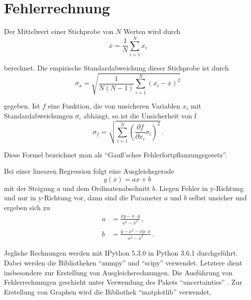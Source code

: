 \section{Fehlerrechnung}
\label{sec:Fehlerrechnung}
Der Mittelwert einer Stichprobe von $N$ Werten wird durch
\begin{equation}
  \overline{x} = \frac{1}{N} \sum\limits_{i = 1}^N x_i
  \label{eqn:mean}
\end{equation}

berechnet.
Die empirische Standardabweichung dieser Stichprobe ist durch
\begin{equation}
  \sigma_x = \sqrt{\frac{1}{N(N-1)}
    \sum\limits_{i = 1}^N
    (x_i-\overline{x})^2}
    \label{eqn:std}
\end{equation}

gegeben.
Ist $f$ eine Funktion, die von unsicheren Variablen $x_i$ mit
Standardabweichungen $\sigma_i$ abhängt, so ist die Unsicherheit von f
\begin{equation}
  \sigma_f = \sqrt{
    \sum\limits_{i = 1}^N
      \left( \frac{\partial f}{\partial x_i} \sigma_i \right)^{\!\! 2}
  }\,.
  \label{eqn:gaussfehler}
\end{equation}

Diese Formel bezeichnet man als \enquote{Gauß'sches Fehlerfortpflanzungsgesetz}.

Bei einer linearen Regression folgt eine Ausgleichsgerade
\begin{equation}
  y(x) = ax+b\,
  \label{eqn:ausgleichsgerade}
\end{equation}
mit der Steigung $a$ und dem Ordinatenabschnitt $b$. Liegen Fehler in y-Richtung
und nur in y-Richtung vor, dann sind die Parameter $a$ und $b$ selbst unsicher
und ergeben sich zu
\begin{align}
  a &= \frac{\overline{xy}-\overline{x} \cdot \overline{y}}{\overline{x^2}-\overline{x}^2}\,,\\
  b &= \frac{\overline{y}-\overline{x^2}-\overline{xy} \cdot \overline{x}}{\overline{x^2}-\overline{x}^2}\,.
\end{align}

Jegliche Rechnungen werden mit IPython 5.3.0 in Python 3.6.1 durchgeführt. Dabei
werden die Bibliotheken \enquote{numpy} \cite{numpy} und \enquote{scipy} \cite{scipy} verwendet.
Letztere dient insbesondere zur Erstellung von Ausgleichsrechnungen.
Die Ausführung von Fehlerrechnungen geschieht unter Verwendung des Pakets
\enquote{uncertainties} \cite{uncertainties}. Zur Erstellung von Graphen wird die Bibliothek
\enquote{matplotlib} \cite{matplotlib} verwendet.
